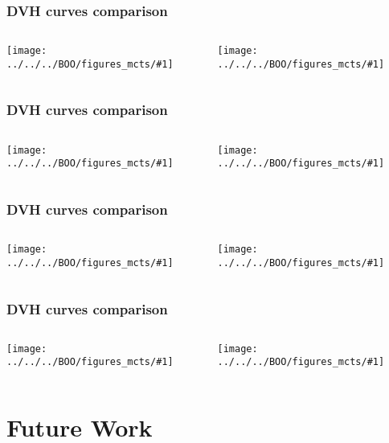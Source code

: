 \newcommand{\putdvhii}[2]{\texttt{[image: ../../../BOO/figures\_mcts/\#1]}}
\begin{frame}
\frametitle{DVH curves comparison}
	\centering
	\begin{columns}[c]
		\begin{column}{.5\textwidth}
			\putdvhii{Case008/dvh_7.png}{\dosewidth} 
		\end{column}
		\begin{column}{.5\textwidth}
			\putdvhii{Case023/dvh_8.png}{\dosewidth} 
		\end{column}
	\end{columns}
\end{frame}

\begin{frame}
\frametitle{DVH curves comparison}
\centering
\begin{columns}[c]
	\begin{column}{.5\textwidth}
		\putdvhii{Case030/dvh_2.png}{\dosewidth} 
	\end{column}
	\begin{column}{.5\textwidth}
		\putdvhii{Case035/dvh_5.png}{\dosewidth} 
	\end{column}
\end{columns}
\end{frame}

\begin{frame}
\frametitle{DVH curves comparison}
	\centering
	\begin{columns}[c]
		\begin{column}{.5\textwidth}
			\putdvhii{Case040/dvh_2.png}{\dosewidth} 
		\end{column}
		\begin{column}{.5\textwidth}
			\putdvhii{Case057/dvh_9.png}{\dosewidth} 
		\end{column}
	\end{columns}
\end{frame}

\begin{frame}
\frametitle{DVH curves comparison}
\centering
%
\begin{columns}[c]
	\begin{column}{.5\textwidth}
		\putdvhii{Case087/dvh_9.png}{\dosewidth}
	\end{column}
	\begin{column}{.5\textwidth}
		\putdvhii{Case091/dvh_1.png}{\dosewidth} 
	\end{column}
\end{columns}
\end{frame}

\section{Future Work}